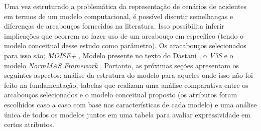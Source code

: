 Uma vez estruturado a problemática da representação de cenários de acidentes em termos de um modelo computacional, é possível discutir semelhanças e diferenças de arcabouços fornecidos na literatura. Isso possibilita inferir implicações que ocorrem ao fazer uso de um arcabouço em específico (tendo o modelo conceitual desse estudo como parâmetro). Os aracabouços selecionados para isso são; \textit{MOISE+} \cite{moiseframework}, Modelo presente no texto do Dastani \cite{dastaniframework}, o \textit{V3S} \cite{v3sframework} e o modelo \textit{NormMAS Framework} \cite{normas}. Portanto, as próximas seções apresentam os seguintes aspectos: análise da estrutura do modelo para aqueles onde isso não foi feito na fundamentação, tabelas que realizam uma análise comparativa entre os arcabouços selecionados e o modelo conceitual proposto (os atributos foram escolhidos caso a caso com base nas características de cada modelo) e uma análise única de todos os modelos juntos em uma tabela para avaliar expressividade em certos atributos.